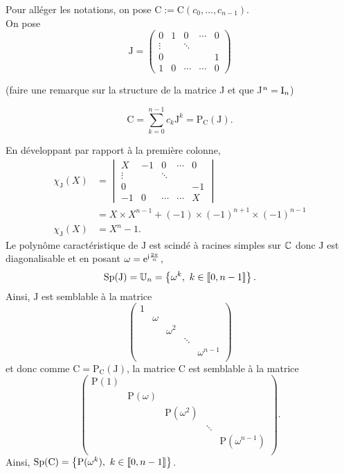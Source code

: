 \begin{preuve}
    Pour alléger les notations, on pose $\mathrm{C} := \mathrm{C}(c_0, \dots, c_{n-1})$. \\
    On pose 
    $$
    \mathrm{J} = 
    \begin{pmatrix}
    0 & 1 & 0 & \cdots & 0 \\
    \vdots  &   & \ddots & \\
    0 & & & & 1 \\
    1 & 0 & \cdots & \cdots & 0
    \end{pmatrix}
    $$
    
    (faire une remarque sur la structure de la matrice J et que J$^n = \mathrm{I}_n$) 
    
    $$\mathrm{C} = \sum_{k=0}^{n-1} c_k \mathrm{J}^k = \mathrm{P}_{\mathrm{C}}(\mathrm{J}).$$
    
    En développant par rapport à la première colonne, 
    \begin{align*}
        \chi_{\mathrm{J}}(X) &= 
        \begin{vmatrix}
            X & -1 & 0 & \cdots & 0 \\
            \vdots  &   & \ddots & \\
            0 & & & & -1 \\
            -1 & 0 & \cdots & \cdots & X
        \end{vmatrix} \\
        &= X \times X^{n-1} + (-1) \times (-1)^{n+1} \times (-1)^{n-1} \\
        \chi_{\mathrm{J}}(X) &= X^n-1. 
    \end{align*}
    Le polynôme caractéristique de $\mathrm{J}$ est scindé à racines simples sur $\mathbb{C}$ donc $\mathrm{J}$ est diagonalisable et en posant $\omega = \mathrm{e}^{\mathrm{i} \frac{2 \pi}{n}}$, 
    $$\mathrm{Sp}(\mathrm{J}) = \mathbb{U}_n = \left \{ \omega^k,\ k \in \llbracket 0, n-1 \rrbracket \right \}.$$
    Ainsi, $\mathrm{J}$ est semblable à la matrice 
    $$
    \begin{pmatrix}
    1 & & & & \\
    & \omega & & & \\
    & & \omega^2 & & \\
    & & & \ddots & \\
    & & & & \omega^{n-1} \\
    \end{pmatrix}
    $$
    et donc comme $\mathrm{C} = \mathrm{P}_{\mathrm{C}}(\mathrm{J})$, la matrice $\mathrm{C}$ est semblable à  la matrice
    $$
    \begin{pmatrix}
    \mathrm{P}(1) & & & & \\
    & \mathrm{P}(\omega) & & & \\
    & & \mathrm{P}(\omega^2) & & \\
    & & & \ddots & \\
    & & & & \mathrm{P}(\omega^{n-1}) \\
    \end{pmatrix}.
    $$
    Ainsi, $\mathrm{Sp}(\mathrm{C}) = \left \{ \mathrm{P}(\omega^k),\ k \in \llbracket 0, n-1 \rrbracket \right \}$.
\end{preuve}

